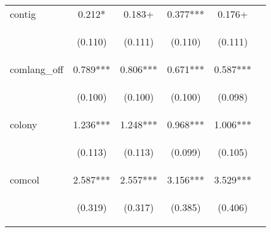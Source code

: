 \begin{center}
\begin{tabular}{lccccc}
contig & 0.212* & 0.183+ & 0.377*** & 0.176+ &  \\
\vspace{4pt} & \begin{footnotesize}(0.110)\end{footnotesize} & \begin{footnotesize}(0.111)\end{footnotesize} & \begin{footnotesize}(0.110)\end{footnotesize} & \begin{footnotesize}(0.111)\end{footnotesize} & \begin{footnotesize}\end{footnotesize} \\
comlang\_off & 0.789*** & 0.806*** & 0.671*** & 0.587*** &  \\
\vspace{4pt} & \begin{footnotesize}(0.100)\end{footnotesize} & \begin{footnotesize}(0.100)\end{footnotesize} & \begin{footnotesize}(0.100)\end{footnotesize} & \begin{footnotesize}(0.098)\end{footnotesize} & \begin{footnotesize}\end{footnotesize} \\
colony & 1.236*** & 1.248*** & 0.968*** & 1.006*** &  \\
\vspace{4pt} & \begin{footnotesize}(0.113)\end{footnotesize} & \begin{footnotesize}(0.113)\end{footnotesize} & \begin{footnotesize}(0.099)\end{footnotesize} & \begin{footnotesize}(0.105)\end{footnotesize} & \begin{footnotesize}\end{footnotesize} \\
comcol & 2.587*** & 2.557*** & 3.156*** & 3.529*** &  \\
\vspace{4pt} & \begin{footnotesize}(0.319)\end{footnotesize} & \begin{footnotesize}(0.317)\end{footnotesize} & \begin{footnotesize}(0.385)\end{footnotesize} & \begin{footnotesize}(0.406)\end{footnotesize} & \begin{footnotesize}\end{footnotesize} \\

\end{tabular}
\end{center}
